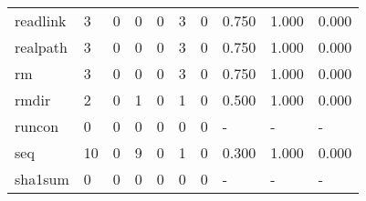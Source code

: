\begin{longtable}{lp{1.3cm}p{1.3cm}p{1.3cm}p{1.3cm}p{1.3cm}p{1.3cm}p{1.3cm}p{1.3cm}p{1.3cm}}
readlink  &                      3 &                                             0 &                                            0 &                                           0 &                                            3 &                                          0 &                                0.750 &                                  1.000 &                                0.000 \\
realpath  &                      3 &                                             0 &                                            0 &                                           0 &                                            3 &                                          0 &                                0.750 &                                  1.000 &                                0.000 \\
rm        &                      3 &                                             0 &                                            0 &                                           0 &                                            3 &                                          0 &                                0.750 &                                  1.000 &                                0.000 \\
rmdir     &                      2 &                                             0 &                                            1 &                                           0 &                                            1 &                                          0 &                                0.500 &                                  1.000 &                                0.000 \\
runcon    &                      0 &                                             0 &                                            0 &                                           0 &                                            0 &                                          0 &                                    - &                                      - &                                    - \\
seq       &                     10 &                                             0 &                                            9 &                                           0 &                                            1 &                                          0 &                                0.300 &                                  1.000 &                                0.000 \\
sha1sum   &                      0 &                                             0 &                                            0 &                                           0 &                                            0 &                                          0 &                                    - &                                      - &                                    - \\

\end{longtable}
